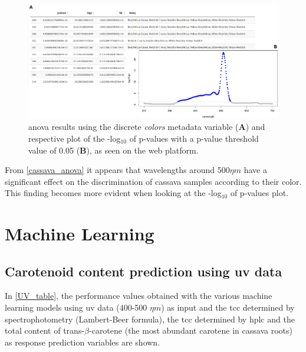 \begin{figure}[h]
	\centering
	\includegraphics[width=1\linewidth]{Imagens/Case_study/anova_table_plot}
	\caption{\gls{anova} results using the discrete \textit{colors} metadata variable (\textbf{A}) and respective plot of the -log$_{10}$ of p-values with a p-value threshold value of 0.05 (\textbf{B}), as seen on the web platform.}
	\label{cassava_anova}
\end{figure}

From \autoref{cassava_anova} it appears that wavelengths around 500$\eta m$ have a significant effect on the discrimination of cassava samples according to their color. This finding becomes more evident when looking at the -log$_{10}$ of p-values plot.


\section{Machine Learning}

\subsection{Carotenoid content prediction using \gls{uv} data} \label{ml_uv_subsec}

In \autoref{UV_table}, the performance values obtained with the various machine learning models using \gls{uv} data (400-500 $\eta m$) as input and the \gls{tcc} determined by spectrophotometry (Lambert-Beer formula), the \gls{tcc} determined by \gls{hplc} and the total content of trans-$\beta$-carotene (the most abundant carotene in cassava roots) as response prediction variables are shown.


